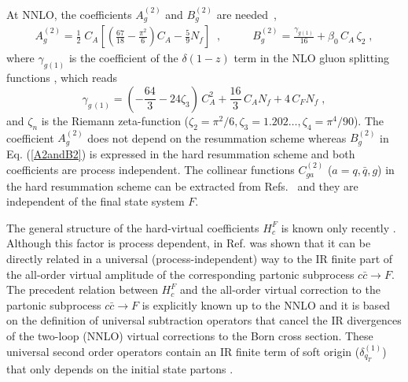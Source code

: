\documentclass[12pt]{article}
\def\beeq{\begin{eqnarray}}
\def\eeeq{\end{eqnarray}}
\newcommand\f[2]{\frac{#1}{#2}}
\def\to{\rightarrow}
\begin{document}
At NNLO, the coefficients $A^{(2)}_{g}$ and $B^{(2)}_{g}$ are needed~\cite{Bozzi:2005wk,Catani:2013tia},
\beeq
\label{A2andB2}
A^{(2)}_{g}= \frac{1}{2}\; C_A \left[ \left( \f{67}{18} - \f{\pi^2}{6}
\right) C_A - \f{5}{9} N_f \right] \;\;,\;\;\;\;\;\;\;\;\;\;B^{(2)}_{g}=\f{\gamma_{g(1)}}{16}+\beta_0\, C_A\,\zeta_2\;,
\eeeq
where $\gamma_{g(1)}$ is the coefficient of the $\delta(1-z)$ term in the NLO gluon splitting functions \cite{Curci:1980uw,Furmanski:1980cm}, which reads
\begin{equation}
\gamma_{g\,(1)}= \left(-\frac{64}3-24\zeta_3\right)\,C_A^2
+\frac{16}3\,C_A N_f
+4\,C_F N_f\;,
\label{ga1g}
\end{equation}
and $\zeta_n$ is the Riemann zeta-function ($\zeta_2=\pi^2/6, \zeta_3=1.202\dots, \zeta_4=\pi^4/90$). The coefficient $A^{(2)}_{g}$ does not depend on the resummation scheme whereas $B^{(2)}_{g}$  in Eq. (\ref{A2andB2}) is expressed in the hard resummation scheme and both coefficients are process independent. The collinear functions $C^{(2)}_{ga}$ ($a=q,{\bar q},g$) in the hard resummation scheme can be extracted from Refs.~\cite{Catani:2013tia,Catani:2011kr} and they are independent of the final state system $F$. 

The general structure of the hard-virtual coefficients $H^{F}_{c}$ is known only recently \cite{Catani:2013tia}. Although this  factor is process dependent, in Ref. \cite{Catani:2013tia} was shown that it can be directly related in a universal (process-independent) way to  the IR finite part of the all-order virtual amplitude of the corresponding partonic subprocess $c{\bar c}\to F$. The precedent relation between $H^{F}_{c}$ and the all-order virtual correction to the  partonic subprocess $c{\bar c}\to F$ is explicitly known up to the NNLO and it is based on the definition of universal subtraction operators that cancel the IR divergences of the two-loop (NNLO) virtual corrections to the Born cross section. These universal second order operators contain an IR finite term of soft origin ($\delta^{(1)}_{q_{T}}$)  that only depends on the initial state partons \cite{Catani:2013tia}.
\end{document}
